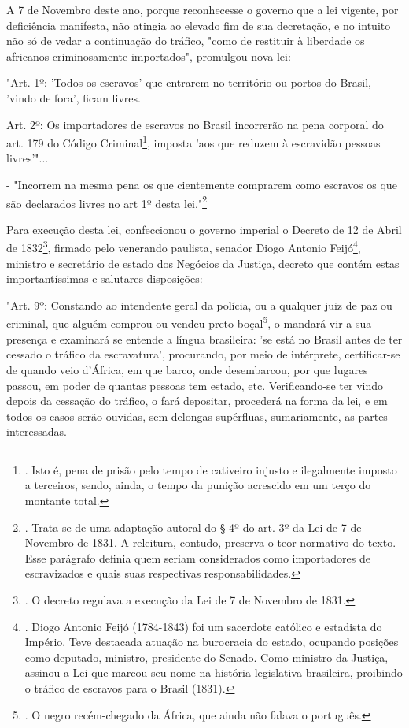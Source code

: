 A 7 de Novembro deste ano, porque reconhecesse o governo que a lei
vigente, por deficiência manifesta, não atingia ao elevado fim de sua
decretação, e no intuito não só de vedar a continuação do tráfico, "como
de restituir à liberdade os africanos criminosamente importados",
promulgou nova lei:

"Art. 1º: 'Todos os escravos' que entrarem no território ou portos do
Brasil, 'vindo de fora', ficam livres.

Art. 2º: Os importadores de escravos no Brasil incorrerão na pena
corporal do art. 179 do Código Criminal\footnote{. Isto é, pena de
  prisão pelo tempo de cativeiro injusto e ilegalmente imposto a
  terceiros, sendo, ainda, o tempo da punição acrescido em um terço do
  montante total.}, imposta 'aos que reduzem à escravidão pessoas
livres'"...

- "Incorrem na mesma pena os que cientemente comprarem como escravos os
que são declarados livres no art 1º desta lei."\footnote{. Trata-se de
  uma adaptação autoral do § 4º do art. 3º da Lei de 7 de Novembro de
  1831. A releitura, contudo, preserva o teor normativo do texto. Esse
  parágrafo definia quem seriam considerados como importadores de
  escravizados e quais suas respectivas responsabilidades.}

Para execução desta lei, confeccionou o governo imperial o Decreto de 12
de Abril de 1832\footnote{. O decreto regulava a execução da Lei de 7 de
  Novembro de 1831.}, firmado pelo venerando paulista, senador Diogo
Antonio Feijó\footnote{. Diogo Antonio Feijó (1784-1843) foi um
  sacerdote católico e estadista do Império. Teve destacada atuação na
  burocracia do estado, ocupando posições como deputado, ministro,
  presidente do Senado. Como ministro da Justiça, assinou a Lei que
  marcou seu nome na história legislativa brasileira, proibindo o
  tráfico de escravos para o Brasil (1831).}, ministro e secretário de
estado dos Negócios da Justiça, decreto que contém estas
importantíssimas e salutares disposições:

"Art. 9º: Constando ao intendente geral da polícia, ou a qualquer juiz
de paz ou criminal, que alguém comprou ou vendeu preto boçal\footnote{.
  O negro recém-chegado da África, que ainda não falava o português.}, o
mandará vir a sua presença e examinará se entende a língua brasileira:
'se está no Brasil antes de ter cessado o tráfico da escravatura',
procurando, por meio de intérprete, certificar-se de quando veio
d'África, em que barco, onde desembarcou, por que lugares passou, em
poder de quantas pessoas tem estado, etc. Verificando-se ter vindo
depois da cessação do tráfico, o fará depositar, procederá na forma da
lei, e em todos os casos serão ouvidas, sem delongas supérfluas,
sumariamente, as partes interessadas.

